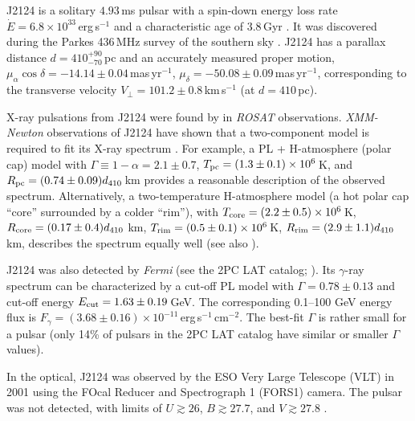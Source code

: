 \documentclass[iop]{emulateapj}
\begin{document}
J2124 is a solitary $4.93$\,ms pulsar with a spin-down energy loss rate $\dot{E}=6.8\times10^{33}$\,erg\,s$^{-1}$ and a characteristic age of 3.8\,Gyr \citep{2016MNRAS.455.1751R}. It was discovered during the Parkes 436\,MHz survey of the southern sky \citep{1997ApJ...481..386B}. J2124 has a parallax distance $d=410^{+90}_{-70}$\,pc and an accurately measured proper motion,  $\mu_\alpha \cos\delta = -14.14 \pm 0.04$\,mas\,yr$^{-1}$, $\mu_\delta = -50.08\pm0.09$\,mas\,yr$^{-1}$\citep{2016MNRAS.455.1751R}, corresponding to the transverse velocity $V_\perp=101.2\pm$0.8\,km\,s$^{-1}$ (at $d=410$\,pc). 

X-ray pulsations from J2124 were found by \citet{1999A&A...341..803B} in {\sl ROSAT} observations. {\sl XMM-Newton} observations of J2124 have shown that a two-component  model is required to fit its X-ray spectrum \citep{2006ApJ...638..951Z}. For example, a PL + H-atmosphere (polar cap)  model with  $\Gamma\equiv1-\alpha=2.1\pm0.7$, $T_{\rm pc}=(1.3\pm0.1)\times10^6$\,K, and $R_{\rm pc}=(0.74\pm0.09) d_{410}$\,km provides a reasonable description of the observed spectrum. Alternatively, a two-temperature H-atmosphere model (a hot polar cap ``core'' surrounded by a colder ``rim''), with $T_{\rm core} = (2.2\pm 0.5)\times10^6$\,K, $R_{\rm core}=(0.17\pm 0.4) d_{410}$ km, $T_{\rm rim}=(0.5\pm 0.1)\times10^6$\,K, $R_{\rm rim}=(2.9\pm 1.1) d_{410}$ km, describes the spectrum equally well (see also \citealt{2008ApJ...689..407B}).

J2124 was also detected by  {\sl Fermi} (see the 2PC LAT catalog; \citealt{2013ApJS..208...17A}). Its $\gamma$-ray spectrum can be characterized by a cut-off PL model with $\Gamma= 0.78\pm0.13$ and cut-off energy $E_{\rm cut} = 1.63\pm0.19$\,GeV.  The  corresponding 0.1--100 GeV energy flux is $F_\gamma = (3.68\pm0.16)\times10^{-11}$\,erg\,s$^{-1}$\,cm$^{-2}$. The best-fit $\Gamma$ is rather small for a  pulsar (only 14\% of pulsars in the  2PC LAT catalog have similar or smaller $\Gamma$ values).

In the optical, J2124 was observed by the ESO Very Large Telescope (VLT) in 2001 using the FOcal Reducer and Spectrograph 1 (FORS1) camera.  The pulsar was not detected, with limits of $U\gtrsim26$, $B\gtrsim27.7$, and $V\gtrsim27.8$ \citep{2004AdSpR..33..616M}.
\end{document}
